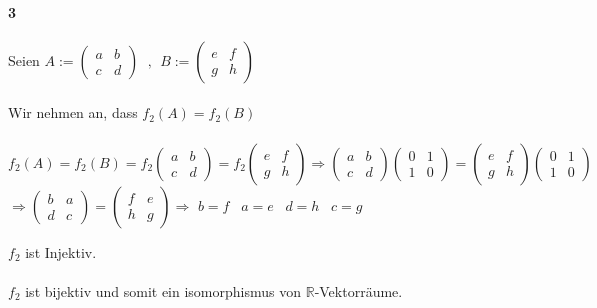\documentclass[10pt,a4paper]{article}
\begin{document}
\paragraph{3}
Seien $A:= \begin{pmatrix}a & b\\c&d\end{pmatrix}\; \text{ , } \;B:= \begin{pmatrix}e&f\\g&h\end{pmatrix}$ \\\\
Wir nehmen an, dass $ f_2(A) = f_2(B) $\\\\
$ f_2(A) = f_2(B) = f_2 \begin{pmatrix}a & b\\c&d \end{pmatrix} = f_2\begin{pmatrix}e&f\\g&h\end{pmatrix} \Rightarrow \begin{pmatrix}a & b\\ c&d \end{pmatrix} \begin{pmatrix}0&1\\1&0\end{pmatrix} = \begin{pmatrix}e&f\\g&h\end{pmatrix}\begin{pmatrix}0 & 1\\1 & 0 \end{pmatrix}$\\
$\Rightarrow \begin{pmatrix}b & a\\ d&c \end{pmatrix} = \begin{pmatrix}f&e\\h&g\end{pmatrix} \Rightarrow$ $b=f\;\;\; a=e\;\;\; d=h\;\;\; c=g$ \begin{flushright} \checkmark \end{flushright}
$f_2$ ist Injektiv.\\\\
$f_2$ ist bijektiv und somit ein isomorphismus von $\mathbb{R}$-Vektorräume.
$$\begin{matrix}
\end{matrix}$$
\newpage
\end{document}
